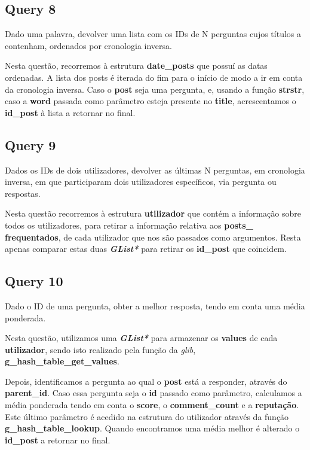 \documentclass[a4paper]{article}
\begin{document}
\subsection{Query 8}

Dado uma palavra, devolver uma lista com os IDs de N perguntas
cujos títulos a contenham, ordenados por cronologia inversa.

Nesta questão, recorremos à estrutura \textbf{date\_posts} que possuí 
as datas ordenadas. A lista dos posts é iterada do fim para o início
de modo a ir em conta da cronologia inversa. Caso o \textbf{post} seja 
uma pergunta, e, usando a função \textbf{strstr}, caso a \textbf{word}
passada como parâmetro esteja presente no \textbf{title}, acrescentamos
o \textbf{id\_post} à lista a retornar no final.

\subsection{Query 9}

Dados os IDs de dois utilizadores, devolver as últimas N perguntas, em
cronologia inversa, em que participaram dois utilizadores específicos, 
via pergunta ou respostas.

Nesta questão recorremos à estrutura \textbf{utilizador} que contém a 
informação sobre todos os utilizadores, para retirar a informação relativa 
aos \textbf{posts\_} \textbf{frequentados}, de cada utilizador que nos são 
passados como argumentos. Resta apenas comparar estas duas 
\textit{\textbf{GList*}} para retirar os \textbf{id\_post} que coincidem.

\subsection{Query 10}

Dado o ID de uma pergunta, obter a melhor resposta, tendo em conta
uma média ponderada.

Nesta questão, utilizamos uma \textit{\textbf{GList*}} para armazenar 
os \textbf{values} de cada \textbf{utilizador}, sendo isto realizado
pela função da \textit{glib}, \textbf{g\_hash\_table\_get\_values}.

Depois, identificamos a pergunta ao qual o \textbf{post} está a responder,
através do \textbf{parent\_id}. Caso essa pergunta seja o \textbf{id}
passado como parâmetro, calculamos a média ponderada tendo em conta o
\textbf{score}, o \textbf{comment\_count} e a \textbf{reputação}. Este
último parâmetro é acedido na estrutura do utilizador através da função
\textbf{g\_hash\_table\_lookup}. Quando encontramos uma média melhor é
alterado o \textbf{id\_post} a retornar no final.
\end{document}
